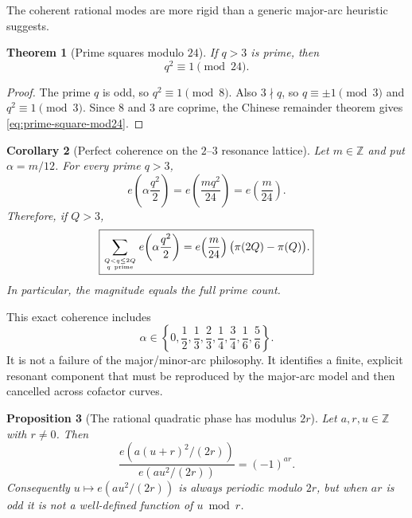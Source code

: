 \documentclass[11pt]{article}
\newtheorem{theorem}{Theorem}[section]
\newtheorem{proposition}[theorem]{Proposition}
\newtheorem{corollary}[theorem]{Corollary}
\theoremstyle{definition}
\newcommand{\1}{\mathbf{1}}
\begin{document}
The coherent rational modes are more rigid than a generic major-arc heuristic suggests.

\begin{theorem}[Prime squares modulo $24$]
\label{thm:prime-square-mod24}
If $q>3$ is prime, then
\begin{equation}
 \boxed{q^2\equiv1\pmod{24}.}
 \label{eq:prime-square-mod24}
\end{equation}
\end{theorem}

\begin{proof}
The prime $q$ is odd, so $q^2\equiv1\pmod8$.  Also $3\nmid q$, so $q\equiv\pm1\pmod3$ and $q^2\equiv1\pmod3$.  Since $8$ and $3$ are coprime, the Chinese remainder theorem gives \cref{eq:prime-square-mod24}.
\end{proof}

\begin{corollary}[Perfect coherence on the $2$--$3$ resonance lattice]
\label{cor:perfect-prime-coherence}
Let $m\in\mathbb Z$ and put $\alpha=m/12$.  For every prime $q>3$,
\begin{equation}
 e\!\left(\alpha\frac{q^2}{2}\right)
 =e\!\left(\frac{m q^2}{24}\right)
 =e\!\left(\frac m{24}\right).
 \label{eq:perfect-prime-phase}
\end{equation}
Therefore, if $Q>3$,
\begin{equation}
 \boxed{
 \sum_{Q<q\le2Q\atop q\ {\rm prime}}
 e\!\left(\alpha\frac{q^2}{2}\right)
 =e\!\left(\frac m{24}\right)
 \bigl(\pi(2Q)-\pi(Q)\bigr).
 }
 \label{eq:perfect-prime-sum}
\end{equation}
In particular, the magnitude equals the full prime count.
\end{corollary}

This exact coherence includes
\[
 \alpha\in\left\{0,\frac12,\frac13,\frac23,\frac14,\frac34,
 \frac16,\frac56\right\}.
\]
It is not a failure of the major/minor-arc philosophy.  It identifies a finite, explicit resonant component that must be reproduced by the major-arc model and then cancelled across cofactor curves.

\begin{proposition}[The rational quadratic phase has modulus $2r$]
\label{prop:phase-modulus-two-r}
Let $a,r,u\in\mathbb Z$ with $r\ne0$.  Then
\begin{equation}
 \frac{e\!\left(a(u+r)^2/(2r)\right)}
      {e\!\left(au^2/(2r)\right)}
 =(-1)^{ar}.
 \label{eq:phase-shift-r}
\end{equation}
Consequently $u\mapsto e(au^2/(2r))$ is always periodic modulo $2r$, but when $ar$ is odd it is not a well-defined function of $u\bmod r$.
\end{proposition}
\end{document}
